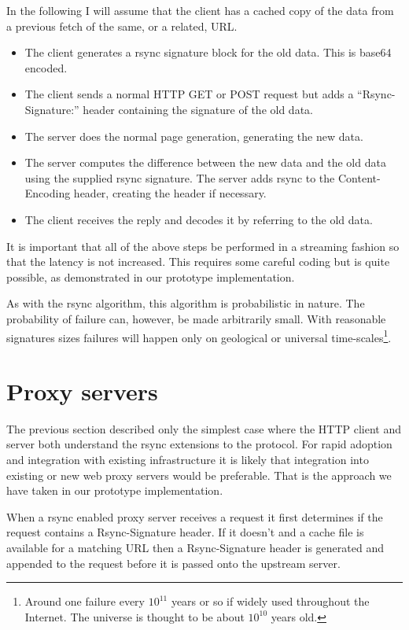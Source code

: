 \documentclass[a4paper]{article}
\begin{document}
In the following I will assume that the client has a cached copy of
the data from a previous fetch of the same, or a related, URL.

\begin{itemize}
\item The client generates a rsync signature block for the old
  data. This is base64 encoded.
\item The client sends a normal HTTP GET or POST request but adds a
  ``Rsync-Signature:'' header containing the signature of the old
  data.
\item The server does the normal page generation, generating the new
  data.
\item The server computes the difference between the new data and the
  old data using the supplied rsync signature. The server adds rsync
  to the Content-Encoding header, creating the header if necessary.
\item The client receives the reply and decodes it by referring to the
  old data. 
\end{itemize}

It is important that all of the above steps be performed in a
streaming fashion so that the latency is not increased. This requires
some careful coding but is quite possible, as demonstrated in our
prototype implementation.

As with the rsync algorithm, this algorithm is probabilistic in
nature. The probability of failure can, however, be made arbitrarily
small. With reasonable signatures sizes failures will happen only on
geological or universal time-scales\footnote{Around one failure every
  $10^{11}$ years or so if widely used throughout the Internet. The
  universe is thought to be about $10^{10}$ years old.}.

\section*{Proxy servers}

The previous section described only the simplest case where the HTTP
client and server both understand the rsync extensions to the
protocol. For rapid adoption and integration with existing
infrastructure it is likely that integration into existing or new web
proxy servers would be preferable. That is the approach we have taken
in our prototype implementation.

When a rsync enabled proxy server receives a request it first
determines if the request contains a Rsync-Signature header. If it
doesn't and a cache file is available for a matching URL then a
Rsync-Signature header is generated and appended to the request before
it is passed onto the upstream server.
\end{document}
